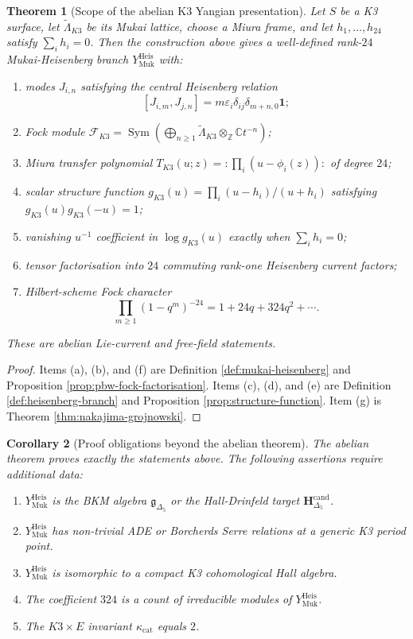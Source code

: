\documentclass[11pt]{article}
\newtheorem{theorem}{Theorem}[section]
\newtheorem{corollary}[theorem]{Corollary}
\theoremstyle{definition}
\theoremstyle{remark}
\DeclareMathOperator{\Sym}{Sym}
\newcommand{\Fock}{\mathcal{F}_{K3}}
\newcommand{\gDel}{\mathfrak{g}_{\Delta_5}}
\newcommand{\HD}{\mathbf{H}_{\Delta_5}^{\mathrm{cand}}}
\newcommand{\Lmuk}{\widetilde{\Lambda}_{K3}}
\newcommand{\LmukC}{\Lmuk \otimes_{\mathbb{Z}} \mathbb{C}}
\newcommand{\YHeis}{Y^{\mathrm{Heis}}_{\mathrm{Muk}}}
\begin{document}
\begin{theorem}[Scope of the abelian K3 Yangian presentation]
\label{thm:abelian-k3-yangian-scope}
Let $S$ be a K3 surface, let $\Lmuk$ be its Mukai lattice, choose a
Miura frame, and let $h_1,\ldots,h_{24}$ satisfy $\sum_i h_i=0$.
Then the construction above gives a well-defined rank-$24$
Mukai-Heisenberg branch $\YHeis$ with:
\begin{enumerate}[label=\textup{(\alph*)}]
\item modes $J_{i,n}$ satisfying the central Heisenberg relation
\[
  [J_{i,m},J_{j,n}]
  =
  m\varepsilon_i\delta_{ij}\delta_{m+n,0}\mathbf{1};
\]
\item Fock module
$\Fock=\Sym(\bigoplus_{n\geq 1}\LmukC t^{-n})$;
\item Miura transfer polynomial
$T_{K3}(u;z)=:\prod_i(u-\phi_i(z)):$ of degree $24$;
\item scalar structure function
$g_{K3}(u)=\prod_i(u-h_i)/(u+h_i)$ satisfying
$g_{K3}(u)g_{K3}(-u)=1$;
\item vanishing $u^{-1}$ coefficient in $\log g_{K3}(u)$ exactly when
$\sum_i h_i=0$;
\item tensor factorisation into $24$ commuting rank-one Heisenberg
current factors;
\item Hilbert-scheme Fock character
\[
  \prod_{m\geq 1}(1-q^m)^{-24}
  =
  1+24q+324q^2+\cdots .
\]
\end{enumerate}
These are abelian Lie-current and free-field statements.
\end{theorem}

\begin{proof}
Items (a), (b), and (f) are Definition \ref{def:mukai-heisenberg} and
Proposition \ref{prop:pbw-fock-factorisation}. Items (c), (d), and
(e) are Definition \ref{def:heisenberg-branch} and Proposition
\ref{prop:structure-function}. Item (g) is Theorem
\ref{thm:nakajima-grojnowski}.
\end{proof}

\begin{corollary}[Proof obligations beyond the abelian theorem]
\label{cor:outside-abelian-theorem}
The abelian theorem proves exactly the statements above. The following
assertions require additional data:
\begin{enumerate}[label=\textup{(\arabic*)}]
\item $\YHeis$ is the BKM algebra $\gDel$ or the Hall-Drinfeld target
$\HD$.
\item $\YHeis$ has non-trivial ADE or Borcherds Serre relations at a
generic K3 period point.
\item $\YHeis$ is isomorphic to a compact K3 cohomological Hall
algebra.
\item The coefficient $324$ is a count of irreducible modules of
$\YHeis$.
\item The $K3\times E$ invariant $\kappa_{\mathrm{cat}}$ equals $2$.
\end{enumerate}
\end{corollary}
\end{document}
